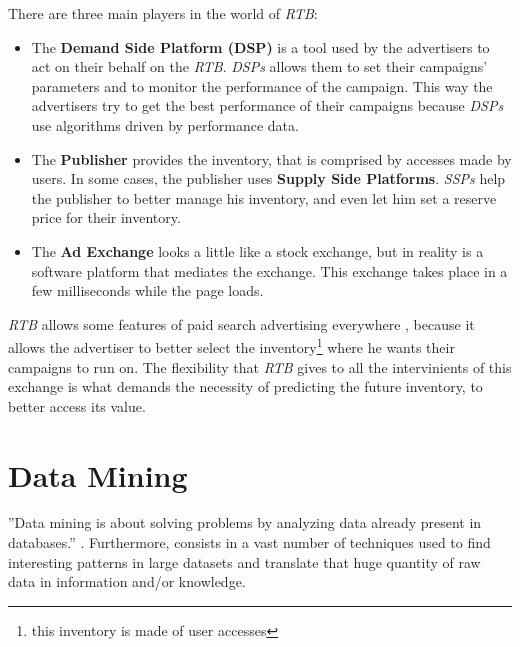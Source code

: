 There are three main players in the world of \emph{RTB}: \begin{itemize} \item\label{itm:dsp} The \textbf{Demand Side Platform
      (DSP)} is a tool used by the advertisers to act on their behalf
      on the \emph{RTB}. \emph{DSPs} allows them to set their
      campaigns' parameters and to monitor the performance of the campaign. This
      way the advertisers try to get the best performance of their campaigns
      because \emph{DSPs} use algorithms driven by performance
      data.\cite{Gern201230} \item\label{itm:ssp} The \textbf{Publisher}
        provides the inventory, that is comprised by accesses made by users. In
        some cases, the publisher uses \textbf{Supply Side Platforms}.
        \emph{SSPs} help the publisher to better manage his inventory, and even
        let him set a reserve price for their
        inventory.\cite{Yuan:2013:RBO:2501040.2501980} \item\label{itm:adex} The
          \textbf{Ad Exchange} looks a little like a stock exchange, but in
          reality is a software platform that mediates the exchange. This
          exchange takes place in a few milliseconds while the page loads.
      \end{itemize}

\emph{RTB} allows some features of paid search advertising everywhere
\cite{Gern201230}, because it allows the advertiser to better select the
inventory\footnote{ this inventory is made of user accesses} where he wants
their campaigns to run on. The flexibility that \emph{RTB} gives to all the
intervinients of this exchange is what demands the necessity of predicting the
future inventory, to better access its value.



\section{Data Mining}\label{sec:datamining}
''Data mining is about solving problems by analyzing data already present in
databases.''\cite[p. 5]{Witten:2005:DMP:1205860}
. Furthermore, consists in a vast number of techniques used to find interesting
patterns in large datasets and translate that huge quantity of raw data in
information and/or knowledge. 

